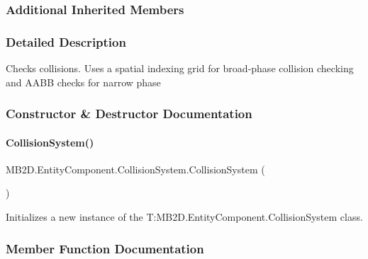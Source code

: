 \subsubsection*{Additional Inherited Members}


\subsubsection{Detailed Description}
Checks collisions. Uses a spatial indexing grid for broad-\/phase collision checking and A\+A\+BB checks for narrow phase 



\subsubsection{Constructor \& Destructor Documentation}
\hypertarget{class_m_b2_d_1_1_entity_component_1_1_collision_system_ac6452aea90e8ee3376b8ea0e089bebc1}{}\label{class_m_b2_d_1_1_entity_component_1_1_collision_system_ac6452aea90e8ee3376b8ea0e089bebc1} 
\paragraph{\texorpdfstring{Collision\+System()}{CollisionSystem()}}
{\footnotesize\ttfamily M\+B2\+D.\+Entity\+Component.\+Collision\+System.\+Collision\+System (\begin{DoxyParamCaption}{ }\end{DoxyParamCaption})\hspace{0.3cm}{\ttfamily [inline]}}



Initializes a new instance of the T\+:\+M\+B2\+D.\+Entity\+Component.\+Collision\+System class. 



\subsubsection{Member Function Documentation}
\hypertarget{class_m_b2_d_1_1_entity_component_1_1_collision_system_ad591227767c8b6c66ca3891de04e9050}{}\label{class_m_b2_d_1_1_entity_component_1_1_collision_system_ad591227767c8b6c66ca3891de04e9050} 
